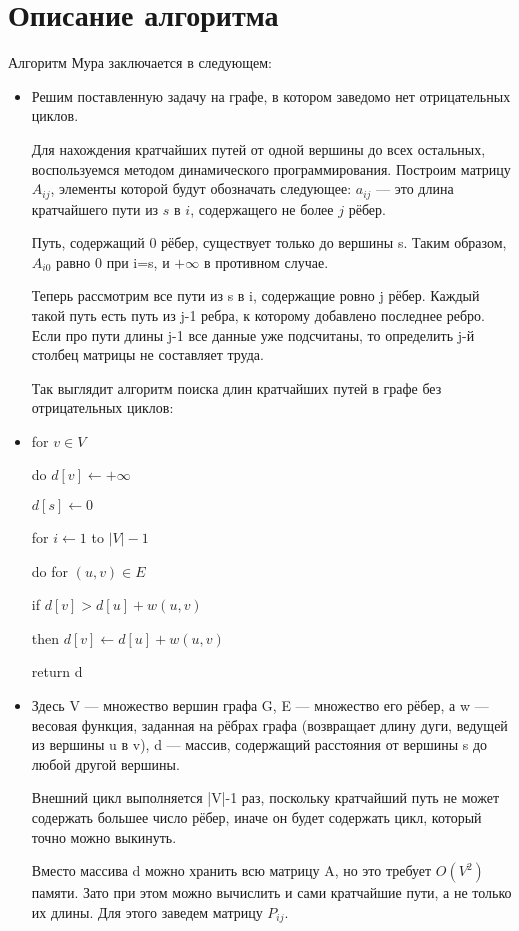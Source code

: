 \documentclass{report}
\begin{document}
\section*{Описание алгоритма}
Алгоритм Мура заключается в следующем:
\begin{itemize}
    

\item Решим поставленную задачу на графе, в котором заведомо нет отрицательных циклов.

Для нахождения кратчайших путей от одной вершины до всех остальных, воспользуемся методом динамического программирования. Построим матрицу $A_{ij}$, элементы которой будут обозначать следующее: $a_{{ij}}$ — это длина кратчайшего пути из $s$ в $i$, содержащего не более $j$ рёбер.

Путь, содержащий 0 рёбер, существует только до вершины s. Таким образом,  $A_{i0}$  равно 0 при  i=s, и  $+\infty$  в противном случае.

Теперь рассмотрим все пути из s в i, содержащие ровно j рёбер. Каждый такой путь есть путь из j-1 ребра, к которому добавлено последнее ребро. Если про пути длины j-1 все данные уже подсчитаны, то определить j-й столбец матрицы не составляет труда.

Так выглядит алгоритм поиска длин кратчайших путей в графе без отрицательных циклов:

\item for 
$v\in V$

    do 
 $d[v]\gets +\infty $
 
$d[s]\gets 0$

for
$i\gets 1$ to 
$|V|-1$

 do for 
$(u,v)\in E$

    if 
$d[v]>d[u]+w(u,v)$

      then 
$d[v]\gets d[u]+w(u,v)$

return 
d


\item Здесь V — множество вершин графа G, E — множество его рёбер, а w — весовая функция, заданная на рёбрах графа (возвращает длину дуги, ведущей из вершины u в v), d — массив, содержащий расстояния от вершины s до любой другой вершины.

Внешний цикл выполняется |V|-1 раз, поскольку кратчайший путь не может содержать большее число рёбер, иначе он будет содержать цикл, который точно можно выкинуть.

Вместо массива d можно хранить всю матрицу A, но это требует $O(V^{2})$ памяти. Зато при этом можно вычислить и сами кратчайшие пути, а не только их длины. Для этого заведем матрицу  $P_{ij}$.


\end{itemize}
\end{document}
